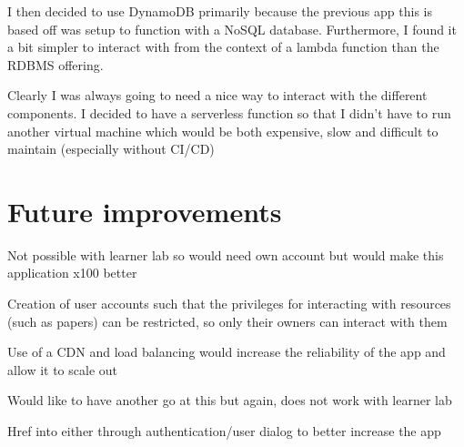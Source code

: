 \documentclass[12pt]{article}
\begin{document}
I then decided to use DynamoDB primarily because the previous app this is based off was setup to function with a NoSQL database. Furthermore, I found it a bit simpler to interact with from the context of a lambda function than the RDBMS offering.

Clearly I was always going to need a nice way to interact with the different components. I decided to have a serverless function so that I didn't have to run another virtual machine which would be both expensive, slow and difficult to maintain (especially without CI/CD)



\section{Future improvements}

Not possible with learner lab so would need own account but would make this application x100 better

Creation of user accounts such that the privileges for interacting with resources (such as papers) can be restricted, so only their owners can interact with them

Use of a CDN and load balancing would increase the reliability of the app and allow it to scale out 

Would like to have another go at this but again, does not work with learner lab

Href into either through authentication/user dialog to better increase the app 

\end{document}
